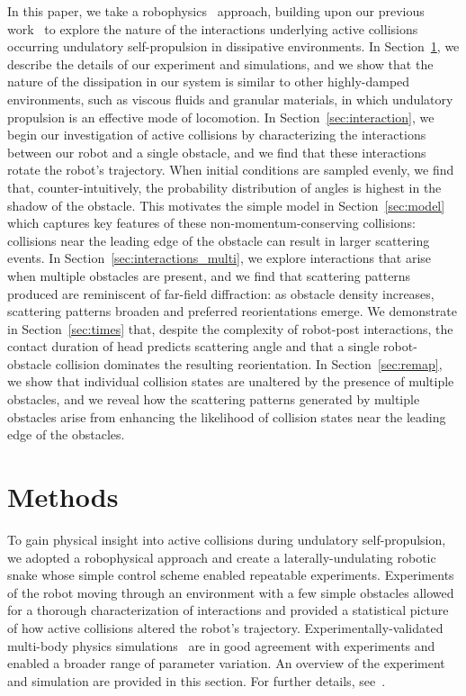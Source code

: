 \documentclass[aps,pre,twocolumn,superscriptaddress]{revtex4-1}
\begin{document}
In this paper, we take a robophysics~\cite{Aguilar:2016bq} approach, building upon our previous work~\cite{Qian:2015ua} to explore the nature of the interactions underlying active collisions occurring undulatory self-propulsion in dissipative environments. In Section~\ref{sec:expAndSim}, we describe the details of our experiment and simulations, and we show that the nature of the dissipation in our system is similar to other highly-damped environments, such as viscous fluids and granular materials, in which undulatory propulsion is an effective mode of locomotion. In Section~\ref{sec:interaction}, we begin our investigation of active collisions by characterizing the interactions between our robot and a single obstacle, and we find that these interactions rotate the robot's trajectory. When initial conditions are sampled evenly, we find that, counter-intuitively, the probability distribution of angles is highest in the shadow of the obstacle. This motivates the simple model in Section~\ref{sec:model} which captures key features of these non-momentum-conserving collisions: collisions near the leading edge of the obstacle can result in larger scattering events. In Section~\ref{sec:interactions_multi}, we explore interactions that arise when multiple obstacles are present, and we find that scattering patterns produced are reminiscent of far-field diffraction:  as obstacle density increases, scattering patterns broaden and preferred reorientations emerge. We demonstrate in Section~\ref{sec:times} that, despite the complexity of robot-post interactions, the contact duration of head predicts scattering angle and that a single robot-obstacle collision dominates the resulting reorientation. In Section~\ref{sec:remap}, we show that individual collision states are unaltered by the presence of multiple obstacles, and we reveal how the scattering patterns generated by multiple obstacles arise from enhancing the likelihood of collision states near the leading edge of the obstacles. 



\section{Methods}\label{sec:expAndSim}

To gain physical insight into active collisions during undulatory self-propulsion, we adopted a robophysical approach and create a laterally-undulating robotic snake whose simple control scheme enabled repeatable experiments. Experiments of the robot moving through an environment with a few simple obstacles allowed for a thorough characterization of interactions and provided a statistical picture of how active collisions altered the robot's trajectory. Experimentally-validated multi-body physics simulations~\cite{pazouki2017compliant} are in good agreement with experiments and enabled a broader range of parameter variation. An overview of the experiment and simulation are provided in this section. For further details, see~\cite{supplemental}.
\end{document}
